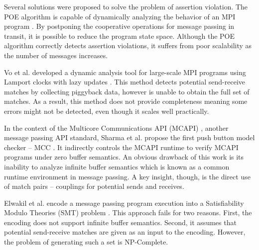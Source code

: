 
Several solutions were proposed to solve the problem of assertion violation. The POE algorithm is capable of dynamically analyzing the behavior of an MPI program \cite{DBLP:conf/ppopp/VakkalankaSGK08}. By postponing the cooperative operations for message passing in transit, it is possible to reduce the program state space. Although the POE algorithm correctly detects assertion violations, it suffers from poor scalability as the number of messages increases. 

Vo et al. developed a dynamic analysis tool for large-scale MPI programs using Lamport clocks with lazy updates \cite{DBLP:conf/sc/VoAGSSB10, DBLP:conf/IEEEpact/VoGKSSB11}. This method detects potential send-receive matches by collecting piggyback data, however is unable to obtain the full set of matches. As a result, this method does not provide completeness meaning some errors might not be detected, even though it scales well practically.

In the context of the Multicore Communications API (MCAPI) \cite{mcapi}, another message passing API standard, Sharma et al. propose the first push button model checker -- MCC \cite{DBLP:conf/fmcad/SharmaGMH09}. It indirectly controls the MCAPI runtime to verify MCAPI programs under zero buffer semantics. An obvious drawback of this work is its inability to analyze infinite buffer semantics which is known as a common runtime environment in message passing. A key insight, though, is the direct use of match pairs -- couplings for potential sends and receives.

Elwakil et al. encode a message passing program execution into a Satisfiability Modulo Theories (SMT) problem  \cite{barrett2008satisfiability} \cite{DBLP:conf/issta/ElwakilY10, DBLP:conf/atva/ElwakilYW10}. This approach fails for two reasons. First, the encoding does not support infinite buffer semantics. Second, it assumes that potential send-receive matches are given as an input to the encoding. However, the problem of generating such a set is NP-Complete.

